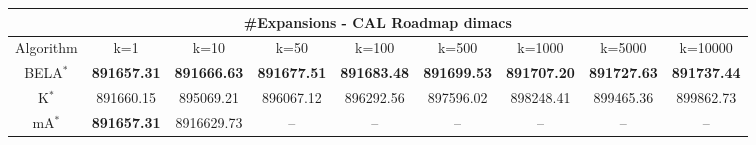 \begin{tabular}{c|cccccccc}\toprule
\multicolumn{9}{c}{#Expansions - CAL Roadmap dimacs}\\ \midrule
Algorithm & k=1 & k=10 & k=50 & k=100 & k=500 & k=1000 & k=5000 & k=10000 \\ \midrule
BELA$^*$ & \textbf{891657.31} & \textbf{891666.63} & \textbf{891677.51} & \textbf{891683.48} & \textbf{891699.53} & \textbf{891707.20} & \textbf{891727.63} & \textbf{891737.44} \\
K$^*$ & 891660.15 & 895069.21 & 896067.12 & 896292.56 & 897596.02 & 898248.41 & 899465.36 & 899862.73 \\
mA$^*$ & \textbf{891657.31} & 8916629.73 & -- & -- & -- & -- & -- & -- \\ \bottomrule 
\end{tabular}
